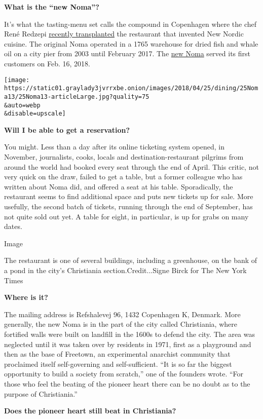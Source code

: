 \textbf{What is the ``new Noma''?}

It's what the tasting-menu set calls the compound in Copenhagen where
the chef René Redzepi
\href{https://www.nytimes3xbfgragh.onion/2015/09/16/dining/noma-rene-redzepi-urban-farm.html}{recently
transplanted} the restaurant that invented New Nordic cuisine. The
original Noma operated in a 1765 warehouse for dried fish and whale oil
on a city pier from 2003 until February 2017. The
\href{http://noma.dk/}{new Noma} served its first customers on Feb. 16,
2018.

\texttt{[image: https://static01.graylady3jvrrxbe.onion/images/2018/04/25/dining/25Noma13/25Noma13-articleLarge.jpg?quality=75\\\&auto=webp\\\&disable=upscale]}

\textbf{Will I be able to get a reservation?}

You might. Less than a day after its online ticketing system opened, in
November, journalists, cooks, locals and destination-restaurant pilgrims
from around the world had booked every seat through the end of April.
This critic, not very quick on the draw, failed to get a table, but a
former colleague who has written about Noma did, and offered a seat at
his table. Sporadically, the restaurant seems to find additional space
and puts new tickets up for sale. More usefully, the second batch of
tickets, running through the end of September, has not quite sold out
yet. A table for eight, in particular, is up for grabs on many dates.

Image

The restaurant is one of several buildings, including a greenhouse, on
the bank of a pond in the city's Christiania section.Credit...Signe
Birck for The New York Times

\textbf{Where is it?}

The mailing address is Refshalevej 96, 1432 Copenhagen K, Denmark. More
generally, the new Noma is in the part of the city called Christiania,
where fortified walls were built on landfill in the 1600s to defend the
city. The area was neglected until it was taken over by residents in
1971, first as a playground and then as the base of Freetown, an
experimental anarchist community that proclaimed itself self-governing
and self-sufficient. ``It is so far the biggest opportunity to build a
society from scratch,'' one of the founders wrote. ``For those who feel
the beating of the pioneer heart there can be no doubt as to the purpose
of Christiania.''

\textbf{Does the pioneer heart still beat in Christiania?}


